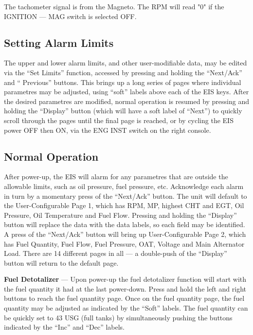 \begin{Note}
The tachometer signal is from the Magneto. The RPM will read "0" if the IGNITION --- MAG switch is selected OFF. 
\end{Note}

\subsection*{Setting Alarm Limits}
The upper and lower alarm limits, and other user-modifiable data, may be edited via the ``Set Limits'' function, accessed by pressing and holding the ``Next/Ack'' and `` Previous'' buttons. This brings up a long series of pages where individual parametres may be adjusted, using ``soft'' labels above each of the EIS keys. After the desired parametres are modified, normal operation is resumed by pressing and holding the ``Display'' button (which will have a soft label of ``Next'') to quickly scroll through the pages until the final page is reached, or by cycling the EIS power OFF then ON, via the ENG INST switch on the right console.

\subsection*{Normal Operation}

After power-up, the EIS will alarm for any parametres that are outside the allowable limits, such as oil pressure, fuel pressure, etc. Acknowledge each alarm in turn by a momentary press of the ``Next/Ack'' button. The unit will default to the User-Configurable Page 1, which has RPM, MP, highest CHT and EGT, Oil Pressure, Oil Temperature and Fuel Flow. Pressing and holding the ``Display'' button will replace the data with the data labels, so each field may be identified. A press of the ``Next/Ack'' button will bring up User-Configurable Page 2, which has Fuel Quantity, Fuel Flow, Fuel Pressure, OAT, Voltage and Main Alternator Load. There are 14 different pages in all --- a double-push of the ``Display'' button will return to the default page.

\textbf{Fuel Detotalizer} --- Upon power-up the fuel detotalizer function will start with the fuel quantity it had at the last power-down.  Press and hold the left and right buttons to reach the fuel quantity page.  Once on the fuel quantity page, the fuel quantity may be adjusted as indicated by the ``Soft'' labels.  The fuel quantity can be quickly set to 43 USG (full tanks) by simultaneously pushing the buttons indicated by the ``Inc'' and ``Dec'' labels.  

